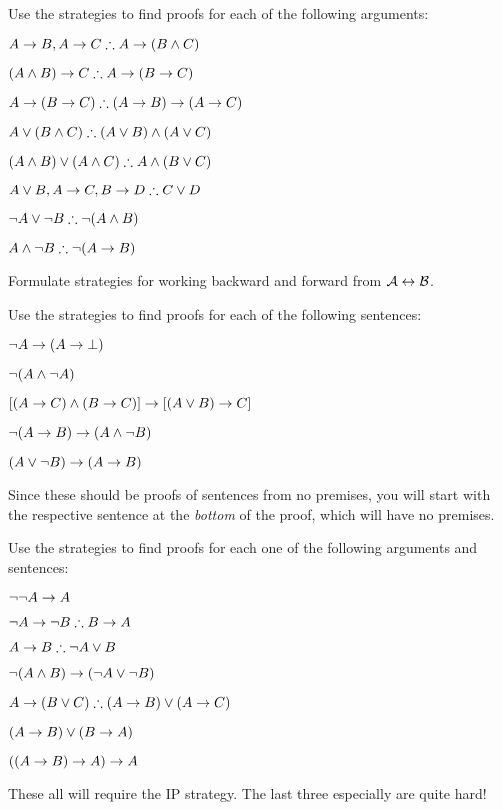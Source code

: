 \practiceproblems

\problempart
Use the strategies to find proofs for each of the following arguments:
\begin{earg}
\item $A \eif B, A \eif C \therefore A \eif (B \eand C)$
\item $(A \eand B) \eif C \therefore A \eif (B \eif C)$
\item $A \eif (B \eif C) \therefore (A \eif B) \eif (A \eif C)$
\item $A \eor (B \eand C) \therefore (A \eor B) \eand (A \eor C)$
\item $(A \eand B) \eor (A \eand C) \therefore A \eand (B \eor C)$
\item $A \eor B, A \eif C, B \eif D \therefore C \eor D$
\item $\enot A \lor \enot B \therefore \enot(A \eand B)$
\item $A \eand \enot B \therefore \enot(A \eif B)$
\end{earg}

\problempart
Formulate strategies for working backward and forward from $\mathcal{A} \leftrightarrow \mathcal{B}$.

\problempart
Use the strategies to find proofs for each of the following sentences:
\begin{earg}
\item $\neg A \rightarrow (A \rightarrow \bot)$
\item $\neg(A \wedge \neg A)$
\item $[(A \rightarrow C) \wedge (B \rightarrow C)] \rightarrow [(A \lor B) \rightarrow C]$
\item $\neg(A \rightarrow B) \rightarrow (A \wedge \neg B)$
\item $(A \vee \neg B) \rightarrow (A \rightarrow B)$
\end{earg}
Since these should be proofs of sentences from no premises, you will start with the respective sentence at the \emph{bottom} of the proof, which will have no premises.

\problempart
Use the strategies to find proofs for each one of the following arguments and sentences:
\begin{earg}
\item $\neg\neg A \rightarrow A$
\item $\enot A \eif \enot B \therefore B \eif A$
\item $A \eif B \therefore \enot A \eor B$
\item $\neg(A \wedge B) \rightarrow (\neg A \vee \neg B)$
\item $A \eif (B \eor C) \therefore (A \eif B) \eor (A \eif C)$
\item $(A \rightarrow B) \lor (B \rightarrow A)$
\item $((A \rightarrow B) \rightarrow A) \rightarrow A$
\end{earg}
These all will require the IP strategy. The last three especially are quite hard!

